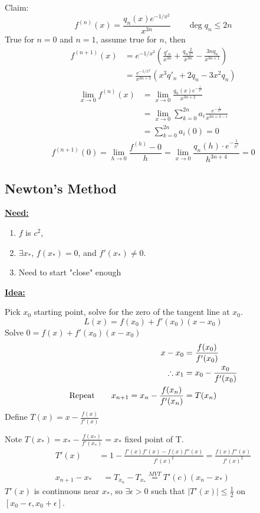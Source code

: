 \documentclass[12pt]{article}
\newcommand{\abs}[1]{\left| #1 \right|}
\theoremstyle{plain}
\newcommand{\dlim}{\displaystyle\lim\limits}
\begin{document}
{  Claim: 
  \[
  	f^{(n)}(x) = \frac{q_n(x) e^{-1/x^2}}{x^{3n}} \qquad \deg q_n\leq 2n
  \]
  True for $n=0$ and $n=1$, assume true for $n$, then 
  \begin{align*}
  	f^{(n+1)}(x) &= e^{-1/x^2}(\frac{q'_n}{x^{3n}}+\frac{q_n\frac2{x^3}}
  	{x^{3n}}-\frac{3nq_n}{x^{3n+1}})\\
  							 &=\frac{e^{-1/x^2}}{x^{3n+3}}(x^3q'_n + 2q_n - 3x^2q_n) 
  \end{align*}
  \begin{align}
		\dlim_{x\to 0} f^{(n)}(x) 
		&= \dlim_{x\to 0} \frac{q_n(x)e^{-\frac1{x^2}}}
		{x^{3n+2}}\\
		&=\dlim_{x\to 0} \sum_{k=0}^{2n}a_i \frac{e^{-\frac1{x^2}}}{x^{3n+3-i}}\\
		&=\sum_{k=0}^{2n}a_i(0)=0
  \end{align}
  \[
  	f^{(n+1)}(0) =\dlim_{h \to 0} \frac{f^{(h)}-0}h 
  	= \dlim_{x\to 0}\frac{q_n(h)\cdot e^{-\frac1{h^2}}}{h^{3n+4}}=0
\]}
	
	\newpage
	\subsection{Newton's Method}

	\textbf{\underline{Need:}}
	\begin{enumerate}
		\item $f$ is $c^2$, 
		\item $\exists x_*$, $f(x_*) = 0$, and $f'(x_*) \neq 0$.
		\item Need to start "close" enough
	\end{enumerate}

	\textbf{\underline{Idea:}}
	
	Pick $x_0 $ starting point, solve for the zero of the tangent line at $x_0$.
	\[
		L(x) = f(x_0) +f'(x_0) (x-x_0)
	\]
	Solve $0 = f(x)+f'(x_0) (x-x_0)$ 
	\begin{align*}
		x - x_0	&=\frac{f(x_0)}{f'(x_0)}\\
		\therefore x_1 &= x_0-\frac{x_0}{f'(x_0)}\\
		\text{Repeat\qquad }x_{n+1} = x_n - \frac{f(x_n)}{f'(x_n)} &= T(x_n)
	\end{align*}
	Define $T(x) = x - \frac{f(x)}{f'(x)}$
	
	Note $T(x_*)=x_* - \frac{f(x_*)}{f'(x_*)}=x_*$ fixed point of T.
	\begin{align*}
		T'(x) &= 1-\frac{f'(x)f'(x)-f(x)f''(x)}{f'(x)^2}
			= \frac{f(x)f''(x)}{f'(x)^2}\\\\
	 	x_{n+1}-x_* 
	 				&\,\,\,= T_{x_n} -T_{x_*} 
	 				\overset{MVT}{=} T'(c) (x_n -x_*) \tag{c between $x_n$ and $x_*$}
	\end{align*}
	$T'(x)$ is continuous near $x_*$, so $\exists \epsilon > 0$ such that
	$\abs{T'(x)} \leq \frac12$ on $[x_0-\epsilon, x_0+\epsilon]$.
\end{document}
